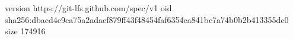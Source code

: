 version https://git-lfs.github.com/spec/v1
oid sha256:dbacd4c9ca75a2adaef879ff43f48454faf6354ea841bc7a74b0b2b413355dc0
size 174916
